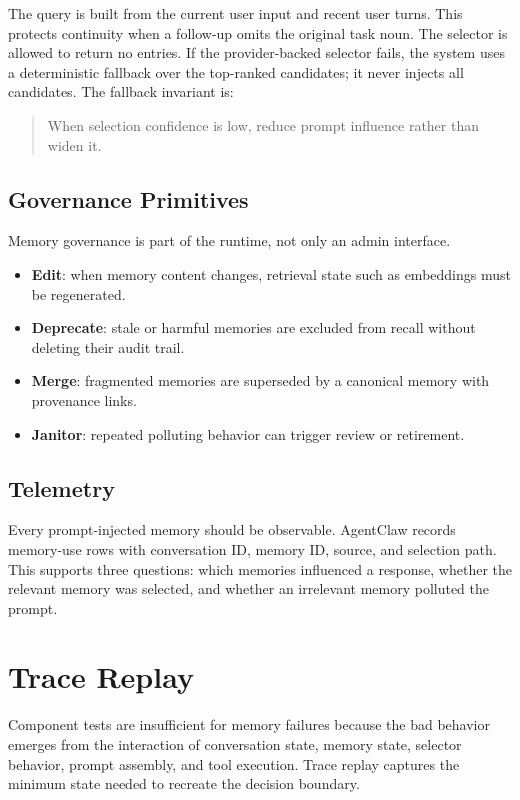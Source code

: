 \documentclass[11pt]{article}
\begin{document}
The query is built from the current user input and recent user turns. This
protects continuity when a follow-up omits the original task noun. The selector
is allowed to return no entries. If the provider-backed selector fails, the
system uses a deterministic fallback over the top-ranked candidates; it never
injects all candidates. The fallback invariant is:

\begin{quote}
When selection confidence is low, reduce prompt influence rather than widen it.
\end{quote}

\subsection{Governance Primitives}

Memory governance is part of the runtime, not only an admin interface.

\begin{itemize}[leftmargin=*]
  \item \textbf{Edit}: when memory content changes, retrieval state such as
  embeddings must be regenerated.
  \item \textbf{Deprecate}: stale or harmful memories are excluded from recall
  without deleting their audit trail.
  \item \textbf{Merge}: fragmented memories are superseded by a canonical memory
  with provenance links.
  \item \textbf{Janitor}: repeated polluting behavior can trigger review or
  retirement.
\end{itemize}

\subsection{Telemetry}

Every prompt-injected memory should be observable. AgentClaw records memory-use
rows with conversation ID, memory ID, source, and selection path. This supports
three questions: which memories influenced a response, whether the relevant
memory was selected, and whether an irrelevant memory polluted the prompt.

\section{Trace Replay}

Component tests are insufficient for memory failures because the bad behavior
emerges from the interaction of conversation state, memory state, selector
behavior, prompt assembly, and tool execution. Trace replay captures the minimum
state needed to recreate the decision boundary.
\end{document}
